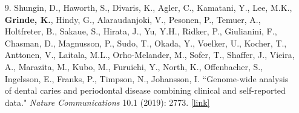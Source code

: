 \documentclass[margin]{res}
\begin{document}
\begin{resume}
\begin{itemize}
\item[9.] Shungin, D., Haworth, S., Divaris, K., Agler, C., Kamatani, Y., Lee, M.K., \textbf{Grinde, K.}, Hindy, G., Alaraudanjoki, V., Pesonen, P., Temuer, A., Holtfreter, B., Sakaue, S., Hirata, J., Yu, Y.H., Ridker, P., Giulianini, F., Chasman, D., Magnusson, P., Sudo, T., Okada, Y., Voelker, U., Kocher, T., Anttonen, V., Laitala, M.L., Orho-Melander, M., Sofer, T., Shaffer, J., Vieira, A., Marazita, M., Kubo, M., Furuichi, Y., North, K., Offenbacher, S., Ingelsson, E., Franks, P., Timpson, N., Johansson, I. ``Genome-wide analysis of dental caries and periodontal disease combining clinical and self-reported data." \textit{Nature Communications} 10.1 (2019): 2773.
\href{https://www.nature.com/articles/s41467-019-10630-1}{[link]}


\end{itemize}
\end{resume}
\end{document}

